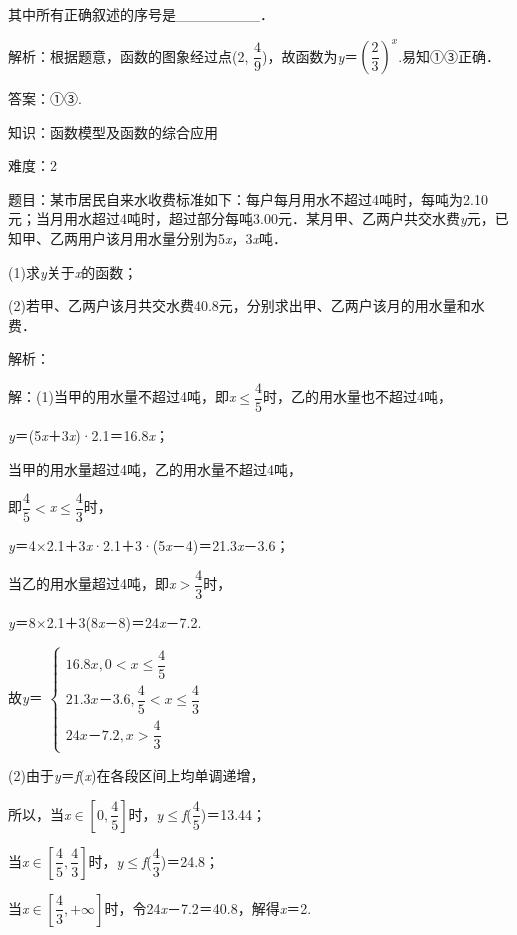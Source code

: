 \documentclass{article} %
\begin{document}
其中所有正确叙述的序号是\_\_\_\_\_\_\_\_．

解析：根据题意，函数的图象经过点(2, $\dfrac{4}{9}$)，故函数为\textit{y}＝$(\dfrac{2}{3})^{x}$.易知①③正确．

答案：①③.

知识：函数模型及函数的综合应用

难度：2

题目：某市居民自来水收费标准如下：每户每月用水不超过4吨时，每吨为2.10元；当月用水超过4吨时，超过部分每吨3.00元．某月甲、乙两户共交水费\textit{y}元，已知甲、乙两用户该月用水量分别为5\textit{x}，3\textit{x}吨．

(1)求\textit{y}关于\textit{x}的函数；

(2)若甲、乙两户该月共交水费40.8元，分别求出甲、乙两户该月的用水量和水费．

解析：

解：(1)当甲的用水量不超过4吨，即\textit{x}$\mathrm{\le}$$\dfrac{4}{5}$时，乙的用水量也不超过4吨，

\textit{y}＝(5\textit{x}＋3\textit{x})·2.1＝16.8\textit{x}；

当甲的用水量超过4吨，乙的用水量不超过4吨，

即$\dfrac{4}{5}$$\mathrm{<}$\textit{x}$\mathrm{\le}$$\dfrac{4}{3}$时，

\textit{y}＝4$\mathrm{\times}$2.1＋3\textit{x}·2.1＋3·(5\textit{x}－4)＝21.3\textit{x}－3.6；

当乙的用水量超过4吨，即\textit{x}$\mathrm{>}$$\dfrac{4}{3}$时，

\textit{y}＝8$\mathrm{\times}$2.1＋3(8\textit{x}－8)＝24\textit{x}－7.2.

故\textit{y}＝
$\left\{
\begin{array}{l}
16.8x,0<x\le\dfrac{4}{5}\\
21.3x－3.6,\dfrac{4}{5}<x\le\dfrac{4}{3}\\
24x－7.2, x>\dfrac{4}{3}
\end{array}
\right.$


(2)由于\textit{y}＝\textit{f}(\textit{x})在各段区间上均单调递增，

所以，当\textit{x}$\mathrm{\in}$$[0,\dfrac{4}{5}]$时，\textit{y}$\mathrm{\le}$\textit{f}($\dfrac{4}{5}$)＝13.44；

当\textit{x}$\mathrm{\in}$$[\dfrac{4}{5},\dfrac{4}{3}]$时，\textit{y}$\mathrm{\le}$\textit{f}($\dfrac{4}{3}$)＝24.8；

当\textit{x}$\mathrm{\in}$$[\dfrac{4}{3},+\infty]$时，令24\textit{x}－7.2＝40.8，解得\textit{x}＝2.
\end{document}
